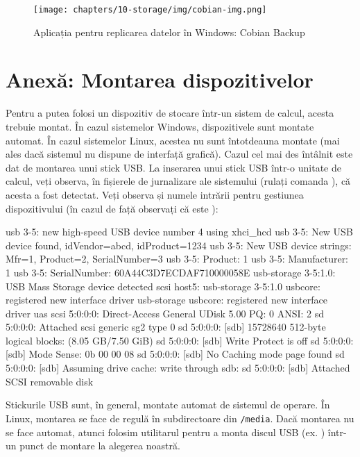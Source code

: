 \begin{figure}[!htbp]
  \centering
  \texttt{[image: chapters/10-storage/img/cobian-img.png]}
  \caption{Aplicația pentru replicarea datelor în Windows: Cobian Backup}
  \label{fig:storage:cobian}
\end{figure}

\section{Anexă: Montarea dispozitivelor}
\label{sec:storage:mount-cmd}

Pentru a putea folosi un dispozitiv de stocare într-un sistem de calcul, acesta
trebuie montat. În cazul sistemelor Windows, dispozitivele sunt montate automat.
În cazul sistemelor Linux, acestea nu sunt întotdeauna montate (mai ales dacă
sistemul nu dispune de interfață grafică). Cazul cel mai des întâlnit este dat de montarea
unui stick USB. La inserarea unui stick USB într-o unitate de calcul, veți
observa, în fișierele de jurnalizare ale sistemului (rulați comanda ), că acesta a
fost detectat. Veți observa și numele intrării pentru gestiunea dispozitivului (în cazul de față observați că
este ):

\begin{screen}
usb 3-5: new high-speed USB device number 4 using xhci_hcd
usb 3-5: New USB device found, idVendor=abcd, idProduct=1234
usb 3-5: New USB device strings: Mfr=1, Product=2, SerialNumber=3
usb 3-5: Product: 1
usb 3-5: Manufacturer: 1
usb 3-5: SerialNumber: 60A44C3D7ECDAF710000058E
usb-storage 3-5:1.0: USB Mass Storage device detected
scsi host5: usb-storage 3-5:1.0
usbcore: registered new interface driver usb-storage
usbcore: registered new interface driver uas
scsi 5:0:0:0: Direct-Access     General  UDisk            5.00 PQ: 0 ANSI: 2
sd 5:0:0:0: Attached scsi generic sg2 type 0
sd 5:0:0:0: [sdb] 15728640 512-byte logical blocks: (8.05 GB/7.50 GiB)
sd 5:0:0:0: [sdb] Write Protect is off
sd 5:0:0:0: [sdb] Mode Sense: 0b 00 00 08
sd 5:0:0:0: [sdb] No Caching mode page found
sd 5:0:0:0: [sdb] Assuming drive cache: write through
 sdb:
sd 5:0:0:0: [sdb] Attached SCSI removable disk
\end{screen}

Stickurile USB sunt, în general, montate automat de sistemul de operare.
În Linux, montarea se face de regulă în subdirectoare din \texttt{/media}.
Dacă montarea nu se face automat, atunci folosim utilitarul  pentru a
monta discul USB (ex. ) într-un punct de montare la alegerea noastră.

